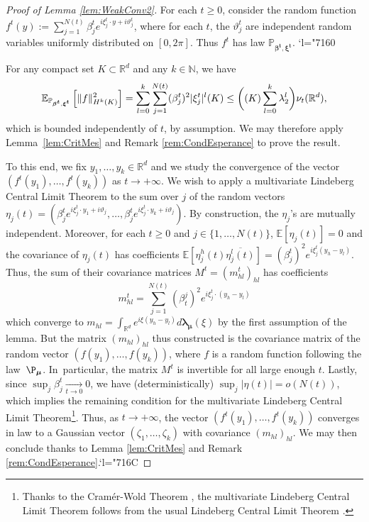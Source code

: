 \documentclass[10pt]{amsart}
\newcommand{\Changel}{\mathcode`l="7160}
\newcommand{\Changelback}{\mathcode`l="716C}
\newcommand{\NoChangel}[1]{%
\expandafter\let\csname old\string#1\endcsname=#1
\let#1=\relax
\newcommand{#1}{\mathcode`l="716C\csname old\string#1\endcsname\mathcode`l="7160 }%
}
\theoremstyle{plain}
\theoremstyle{definition}
\newcommand{\N}{\mathbb{N}}
\newcommand{\R}{\mathbb{R}}
\newcommand{\E}{\mathbb{E}}
\DeclareMathOperator{\Vol}{Vol}\NoChangel{\Vol}
\begin{document}
\begin{proof}[Proof of Lemma \ref{lem:WeakConv2}]
For each $t\geq 0$, consider the random function $f^t(y):=\sum_{j=1}^{N(t)}\beta_j^t e^{i\xi_j^t\cdot y+i\vartheta_j^t}$, where for each $t$, the $\vartheta_j^t$ are independent random variables uniformly distributed on $[0,2\pi]$. Thus $f^t$ has law $\mathbb{P}_{\boldsymbol{\beta^t},\boldsymbol{\xi^t}}$.
\Changel

For any compact set $K\subset \R^d$ and any $k\in \N$, we have\vspace*{-3pt}\enlargethispage{\baselineskip}%
\[
\mathbb{E}_{\mathbb{P}_{\boldsymbol{\beta^t}, \boldsymbol{\xi^t}}}\left[ \|f\|_{H^k(K)}^2 \right]= \sum_{l=0}^k \sum_{j=1}^{N(t)} (\beta_j^t)^2 |\xi_j^t|^l \Vol(K)\leq \biggl(\Vol(K)\sum_{l=0}^k\lambda_2^l\biggr)\nu_t(\R^d),
\]
which is bounded independently of $t$, by assumption. We may therefore apply Lem\-ma~\ref{lem:CritMes} and Remark \ref{rem:CondEsperance} to prove the result.

To this end, we fix $y_1,\dots,y_k\in\R^d$ and we study the convergence of the vector $(f^t(y_1),\dots,f^t(y_k))$ as $t\to +\infty$. We wish to apply a multivariate Lindeberg Central Limit Theorem to the sum over $j$ of the random vectors $\eta_j(t)=(\beta_j^te^{i\xi_j^t\cdot y_1+i\vartheta_j},\dots,\beta_j^te^{i\xi_j^t\cdot y_k+i\vartheta_j})$. By construction, the $\eta_j$'s are mutually independent. Moreover, for each $t\geq 0$ and $j\in\{1,\dots,N(t)\}$, $\E[\eta_j(t)]=0$ and the covariance of $\eta_j(t)$ has coefficients $\E[\eta_j^h(t)\overline{\eta_j^l(t)}]=(\beta_j^t)^2e^{i\xi_j^t(y_h-y_l)}$. Thus, the sum of their covariance matrices $M^t=(m^t_{hl})_{hl}$ has coefficients\vspace*{-3pt}
\[
m^t_{hl}=\sum_{j=1}^{N(t)}(\beta_t^j)^2e^{i\xi_j^t\cdot(y_h-y_l)}
\]
which converge to $m_{hl}=\int_{\R^d} e^{i\xi(y_h-y_l)}d\boldsymbol{\lambda_\mu}(\xi)$ by the first assumption of the lemma. But the matrix $(m_{hl})_{hl}$ thus constructed is the covariance matrix of the random vector $(f(y_1),\dots,f(y_k))$, where $f$ is a random function following the law~$\P_{\boldsymbol{\mu}}$. In~particular, the matrix $M^t$ is invertible for all large enough $t$. Lastly, since $\sup_j \beta_j^t \xrightarrow[t\to 0]{}0$, we have (deterministically) $\sup_j|\eta(t)|=o(N(t))$, which implies the remaining condition for the multivariate Lindeberg Central Limit Theorem\footnote{Thanks to the Cramér-Wold Theorem \cite[Th.\,29.4]{Bili}, the multivariate Lindeberg Central Limit Theorem follows from the usual Lindeberg Central Limit Theorem \cite[Chap.\,27]{Bili}.}. Thus, as $t\to +\infty$, the vector $(f^t(y_1),\dots,f^t(y_k))$ converges in law to a Gaussian vector $(\zeta_1,\dots,\zeta_k)$ with covariance $(m_{hl})_{hl}$. We may then conclude thanks to Lemma \ref{lem:CritMes} and Remark \ref{rem:CondEsperance}.\Changelback
\end{proof}
\end{document}
